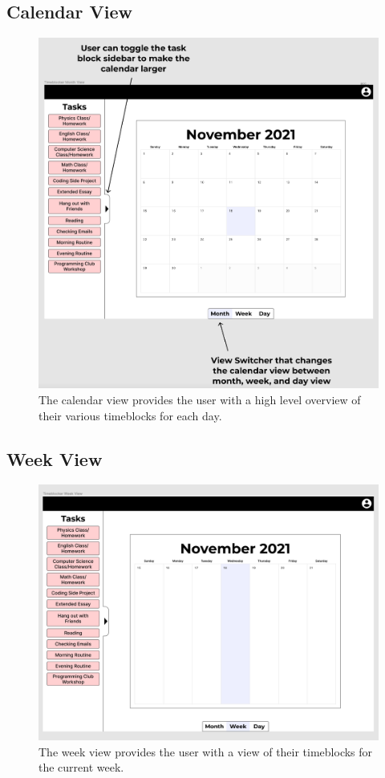 \documentclass[12pt]{report}
\begin{document}
\subsection*{Calendar View}
\begin{figure}[H]
	\caption{The calendar view provides the user with a high level overview of their various timeblocks for each day.}
	\includegraphics[width=\textwidth]{month-view.png}
\end{figure}

\subsection*{Week View}
\begin{figure}[H]
	\caption{The week view provides the user with a view of their timeblocks for the current week.}
	\includegraphics[width=\textwidth]{week-view.png}
\end{figure}
\end{document}
